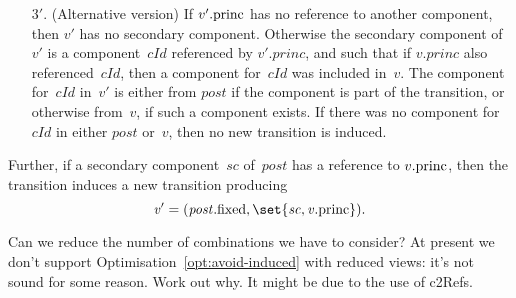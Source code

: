 \begin{definition}
\begin{enumerate}
\item[3$'$.] (Alternative version) If $v'.\mathrm{princ}$ has no reference to another
  component, then $v'$ has no secondary component.  Otherwise the secondary
  component of~$v'$ is a component~$cId$ referenced by $v'.princ$, and such
  that if $v.princ$ also referenced~$cId$, then a component for~$cId$ was
  included in~$v$.  The component for~$cId$ in~$v'$ is either from $post$ if
  the component is part of the transition, or otherwise from~$v$, if such a
  component exists.  If there was no component for~$cId$ in either $post$
  or~$v$, then no new transition is induced.
\end{enumerate}
%
Further, if a secondary component~$sc$ of~$post$ has a reference to $v.\mathrm{princ}$,
then the transition induces a new transition producing
\[\mit
v' = (post.\fixed, \set{sc, v.\princ}).
\]
\end{definition}

\begin{improve}
Can we reduce the number of combinations we have to consider?
At present we don't support Optimisation~\ref{opt:avoid-induced} with reduced
views: it's not sound for some reason.  Work out why.  It might be due to the
use of c2Refs.
\end{improve}

